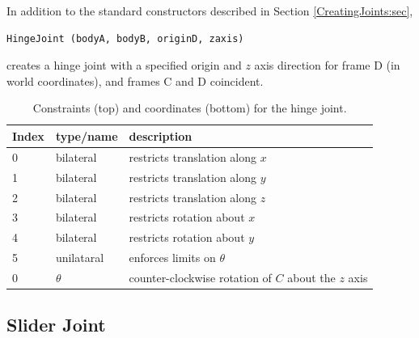 In addition to the standard constructors described in
Section \ref{CreatingJoints:sec},
%
\begin{lstlisting}[]
  HingeJoint (bodyA, bodyB, originD, zaxis)
\end{lstlisting}
%
creates a hinge joint with a specified origin and $z$ axis direction
for frame D (in world coordinates), and frames C and D coincident.

\begin{table}[h]
\centering
\begin{tabular}{|l|l|l|}
\hline
Index & type/name & description \\
\hline
0 & bilateral & restricts translation along $x$ \\
1 & bilateral & restricts translation along $y$ \\
2 & bilateral & restricts translation along $z$ \\
3 & bilateral & restricts rotation about $x$ \\
4 & bilateral & restricts rotation about $y$ \\
5 & unilataral & enforces limits on $\theta$ \\
\hline
\hline
0 & $\theta$ & counter-clockwise rotation of $C$ about the $z$ axis \\
\hline
\end{tabular}
\caption{Constraints (top) and coordinates (bottom) for the hinge joint.}
\label{HingeConstraints:tbl}
\end{table}

\subsection{Slider Joint}

